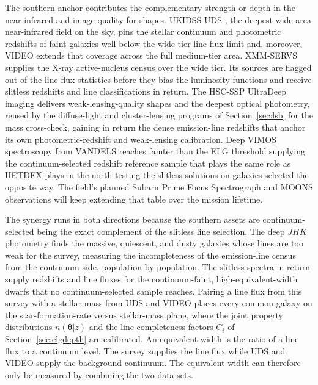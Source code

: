 \documentclass[10pt,onecolumn]{article}
\begin{document}
The southern anchor contributes the complementary strength or depth in the near-infrared and image quality for shapes. UKIDSS UDS \cite{lawrence2007}, the deepest wide-area near-infrared field on the sky, pins the stellar continuum and photometric redshifts of faint galaxies well below the wide-tier line-flux limit and, moreover, VIDEO \cite{jarvis2013} extends that coverage across the full medium-tier area. XMM-SERVS \cite{chen2018} supplies the X-ray active-nucleus census over the wide tier. Its sources are flagged out of the line-flux statistics before they bias the luminosity functions and receive slitless redshifts and line classifications in return. The HSC-SSP UltraDeep imaging \cite{aihara2018} delivers weak-lensing-quality shapes and the deepest optical photometry, reused by the diffuse-light and cluster-lensing programs of Section~\ref{sec:lsb} for the mass cross-check, gaining in return the dense emission-line redshifts that anchor its own photometric-redshift and weak-lensing calibration. Deep VIMOS spectroscopy from VANDELS \cite{mclure2018} reaches fainter than the ELG threshold supplying the continuum-selected redshift reference sample that plays the same role as HETDEX plays in the north testing the slitless solutions on galaxies selected the opposite way. The field's planned Subaru Prime Focus Spectrograph \cite{takada2014} and MOONS observations will keep extending that table over the mission lifetime.

The synergy runs in both directions because the southern assets are continuum-selected being the exact complement of the slitless line selection. The deep $JHK$ photometry finds the massive, quiescent, and dusty galaxies whose lines are too weak for the survey, measuring the incompleteness of the emission-line census from the continuum side, population by population. The slitless spectra in return supply redshifts and line fluxes for the continuum-faint, high-equivalent-width dwarfs that no continuum-selected sample reaches. Pairing a line flux from this survey with a stellar mass from UDS and VIDEO places every common galaxy on the star-formation-rate versus stellar-mass plane, where the joint property distributions $n(\boldsymbol{\theta}|z)$ and the line completeness factors $C_i$ of Section~\ref{sec:elgdepth} are calibrated. An equivalent width is the ratio of a line flux to a continuum level. The survey supplies the line flux while UDS and VIDEO supply the background continuum. The equivalent width can therefore only be measured by combining the two data sets.
\end{document}
